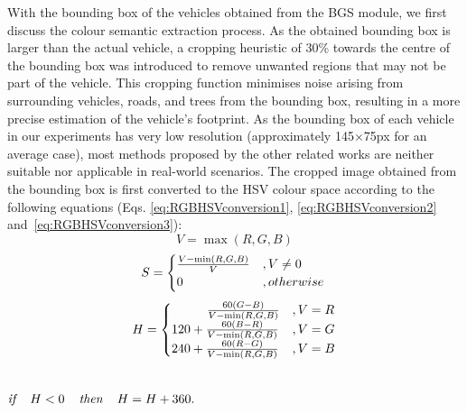 With the bounding box of the vehicles obtained from the BGS module, we first discuss the colour semantic extraction process. 
As the obtained bounding box is larger than the actual vehicle, a cropping heuristic of 30\% towards the centre of the bounding box was introduced to remove unwanted regions that may not be part of the vehicle.
This cropping function minimises noise arising from surrounding vehicles, roads, and trees from the bounding box, resulting in a more precise estimation of the vehicle's footprint.
As the bounding box of each vehicle in our experiments has very low resolution (approximately 145$\times$75px for an average case), most methods proposed by the other related works are neither suitable nor applicable in real-world scenarios.
The cropped image obtained from the bounding box is first converted to the HSV colour space according to the following equations (Eqs. \ref{eq:RGBHSVconversion1}, \ref{eq:RGBHSVconversion2} and~\ref{eq:RGBHSVconversion3}): 
\begin{equation}
\label{eq:RGBHSVconversion1}
V = \max(R,G,B)
\end{equation}
\begin{equation}
\label{eq:RGBHSVconversion2}
S = \begin{cases}\frac{V - \min(R,G,B)}{V} & , V \neq 0\\
0 & , otherwise \end{cases} \\
\end{equation}
\begin{equation}
\label{eq:RGBHSVconversion3}
H = \begin{cases}
\hspace{2.8em} \frac{60(G-B)}{V-\min(R,G,B)} & ,V = R\\
120 + \frac{60(B-R)}{V-\min(R,G,B)} & ,V = G\\
240 + \frac{60(R-G)}{V-\min(R,G,B)} & ,V = B
\end{cases}
\end{equation}
\centerline{\\$\textit{if } \hspace{.8em}H< 0 \hspace{.8em}\textit{ then } \hspace{.8em}H = H+360.$}

